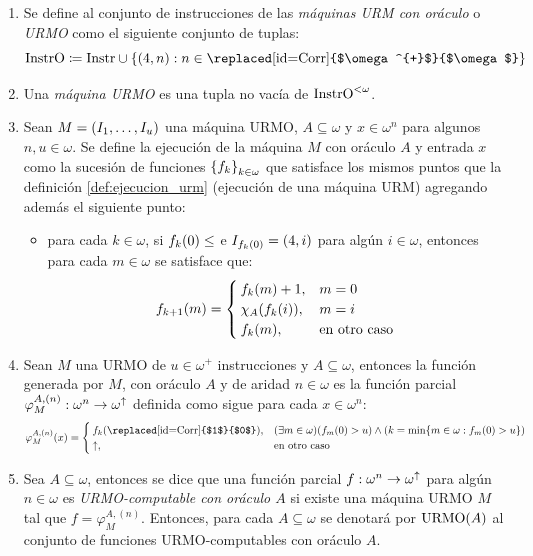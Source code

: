 \begin{agregado}
\begin{definition}
	\label{def: maquinas_urmo}
	\begin{enumerate}
		\item Se define al conjunto de instrucciones de las \emph{máquinas URM con oráculo} o \emph{URMO} como el siguiente conjunto de tuplas:
		\[
			\INSTRUCCIONESO\coloneqq\INSTRUCCIONES\cup\set*{\pa*{4, n}: n\in\mbox{\replaced[id=Corr]{$\omega^{+}$}{$\omega$}}}
		\]
		\item Una \emph{máquina URMO} es una tupla no vacía de $\INSTRUCCIONESO^{<\omega}$.
		\item Sean $M =\pa*{I_{1},\dotsc, I_{u}}$ una máquina URMO, $A\subseteq\omega$ y $x\in\omega^{n}$ para algunos $n, u\in\omega$. Se define la ejecución de la máquina $M$ con oráculo $A$ y entrada $x$ como la sucesión de funciones $\set*{f_{k}}_{k\in\omega}$ que satisface los mismos puntos que la definición \ref{def:ejecucion_urm} (ejecución de una máquina URM) agregando además el siguiente punto:
		\begin{itemize}
			\item para cada $k\in\omega$, si $f_{k}\pa*{0}\leq$  e $I_{f_{k}\pa*{0}} =\pa*{4, i}$ para algún $i\in\omega$, entonces para cada $m\in\omega$ se satisface que:
			\[
				f_{k + 1}\pa*{m} =
				\begin{cases}
					f_{k}\pa*{m} + 1, & m = 0\\
					\CARACTERISTICA{A}\pa*{f_{k}\pa*{i}}, & m = i\\
					f_{k}\pa*{m}, &\text{en otro caso}
				\end{cases}
			\]
		\end{itemize}
		\item Sean $M$ una URMO de $u\in\omega^{+}$ instrucciones y $A\subseteq\omega$, entonces la función generada por $M$, con oráculo $A$ y de aridad $n\in\omega$ es la función parcial $\varphi_{M}^{A, (n)}:\omega^{n}\to\omega^{\DIVERGE}$ definida como sigue para cada $x\in\omega^{n}$:
		\[
			\varphi_{M}^{A, (n)}\pa*{x} =
			\begin{cases}
				f_{k}\pa*{\mbox{\replaced[id=Corr]{$1$}{$0$}}}, &\pa*{\exists m\in\omega}\pa*{f_{m}\pa*{0} > u}\land\pa*{k =\min\set*{m\in\omega: f_{m}\pa*{0} > u}}\\
				\DIVERGE, &\text{en otro caso}
			\end{cases}
		\]
		\item Sea $A\subseteq\omega$, entonces se dice que una función parcial $f:\omega^{n}\to\omega^{\DIVERGE}$ para algún $n\in\omega$ es \emph{URMO-computable con oráculo $A$} si existe una máquina URMO $M$ tal que $f =\varphi_{M}^{A, (n)}$. Entonces, para cada $A\subseteq\omega$ se denotará por $\URMO\pa*{A}$ al conjunto de funciones URMO-computables con oráculo $A$.
	\end{enumerate}
\end{definition}


\end{agregado}

